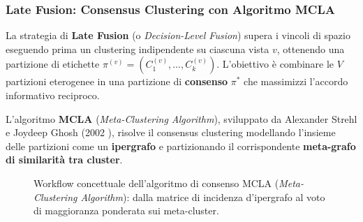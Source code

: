 \FloatBarrier
\subsubsection{Late Fusion: Consensus Clustering con Algoritmo MCLA}
\label{subsec:lab-late-fusion-mcla}

La strategia di \textbf{Late Fusion} (o \textit{Decision-Level Fusion}) supera i vincoli di spazio eseguendo prima un clustering indipendente su ciascuna vista $v$, ottenendo una partizione di etichette $\pi^{(v)} = (C_1^{(v)}, \dots, C_k^{(v)})$. L'obiettivo è combinare le $V$ partizioni eterogenee in una partizione di \textbf{consenso} $\pi^*$ che massimizzi l'accordo informativo reciproco.

L'algoritmo \textbf{MCLA} (\textit{Meta-Clustering Algorithm}), sviluppato da Alexander Strehl e Joydeep Ghosh (2002 \cite{strehl2002}), risolve il consensus clustering modellando l'insieme delle partizioni come un \textbf{ipergrafo} e partizionando il corrispondente \textbf{meta-grafo di similarità tra cluster}.

\FloatBarrier
\begin{figure}[H]
\centering
{}
\caption{Workflow concettuale dell'algoritmo di consenso MCLA (\textit{Meta-Clustering Algorithm}): dalla matrice di incidenza d'ipergrafo al voto di maggioranza ponderata sui meta-cluster.}
\label{fig:mcla-workflow}
\end{figure}

